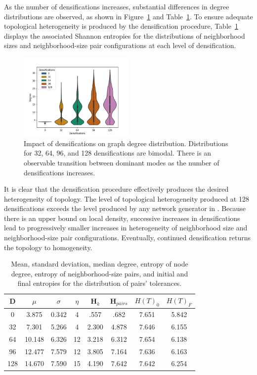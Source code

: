 \documentclass[a4paper]{article}
\begin{document}
As the number of densifications increases, substantial differences in degree distributions are observed, as shown in Figure~\ref*{fig:fig_s4} and Table~\ref*{tab:tab_1}. To ensure adequate topological heterogeneity is produced by the densification procedure, Table~\ref*{tab:tab_1} displays the associated Shannon entropies for the distributions of neighborhood sizes and neighborhood-size pair configurations at each level of densification.

\begin{figure}[H]
    \centering
    \includegraphics[width=0.5\textwidth]{figs4.png}
    \caption{Impact of densifications on graph degree distribution. Distributions for 32, 64, 96, and 128 densifications are bimodal. There is an observable transition between dominant modes as the number of densifications increases.}
    \label{fig:fig_s4}
\end{figure}

 It is clear that the densification procedure effectively produces the desired heterogeneity of topology. The level of topological heterogeneity produced at 128 densifications exceeds the level produced by any network generator in \cite{gandica2016can}. Because there is an upper bound on local density, successive increases in densifications lead to progressively smaller increases in heterogeneity of neighborhood size and neighborhood-size pair configurations. Eventually, continued densification returns the topology to homogeneity. 

\begin{table}[H]
    \centering
    \begin{tabular}{c|ccccccc}
    \hline
    D & $\mu$ & $\sigma$ & $\eta$ & H\(_k\) & H\(_{pairs}\) & \( H(T)_0 \) & \( H(T)_F \) \\
    \hline
    0   & 3.875  & 0.342  & 4   & .557  & .682  & 7.651 & 5.842 \\
    32  & 7.301  & 5.266  & 4  & 2.300 & 4.878 & 7.646 & 6.155 \\
    64  & 10.148 & 6.326  & 12 & 3.218 & 6.312 & 7.654 & 6.138 \\
    96  & 12.477 & 7.579  & 12 & 3.805 & 7.164 & 7.636 & 6.163 \\
    128 & 14.670 & 7.590  & 15 & 4.190 & 7.642 & 7.642 & 6.254 \\
    \hline
    \end{tabular}
    \caption{Mean, standard deviation, median degree, entropy of node degree, entropy of neighborhood-size pairs, and initial and final entropies for the distribution of pairs' tolerances.}
    \label{tab:tab_1}
\end{table}
\end{document}
